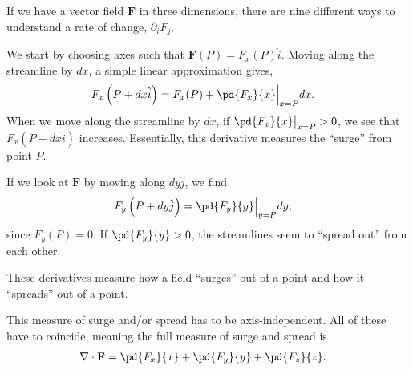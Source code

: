 \documentclass[10pt]{mypackage}
\begin{document}
\begin{example}
  If we have a vector field $\mathbf{F}$ in three dimensions, there are nine different ways to understand a rate of change, $\partial_{i}F_{j}$.\newline

  We start by choosing axes such that $\mathbf{F}(P) = F_x(P)\hat{i}$. Moving along the streamline by $dx$, a simple linear approximation gives,
  \begin{align*}
    F_{x}\left(P + dx\hat{i}\right) &= F_x(P) + \pd{F_x}{x}\Bigr\vert_{x=P} dx.
  \end{align*}
  When we move along the streamline by $dx$, if $\pd{F_x}{x}\bigr\vert_{x=P} > 0$, we see that $F_x\left(P + dx\hat{i}\right)$ increases. Essentially, this derivative measures the ``surge'' from point $P$.\newline

  If we look at $\mathbf{F}$ by moving along $dy \hat{j}$, we find
  \begin{align*}
    F_y\left(P + dy\hat{j}\right) &= \pd{F_y}{y}\Bigr\vert_{y=P}dy,
  \end{align*}
  since $F_y(P) = 0$. If $\pd{F_y}{y} > 0$, the streamlines seem to ``spread out'' from each other.\newline

  These derivatives measure how a field ``surges'' out of a point and how it ``spreads'' out of a point.\newline

  This measure of surge and/or spread has to be axis-independent. All of these have to coincide, meaning the full measure of surge and spread is
  \begin{align*}
    \nabla \cdot \mathbf{F} &= \pd{F_x}{x} + \pd{F_y}{y} + \pd{F_z}{z}.
  \end{align*}
\end{example}
\end{document}
